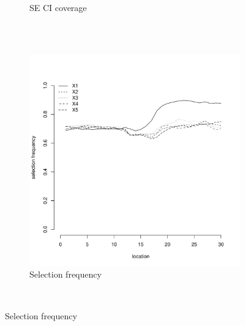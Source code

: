 \documentclass[authoryear, review, 11pt]{elsarticle}
\begin{document}
\begin{figure}
\begin{subfigure}[b]{0.45\textwidth}
		\caption{SE CI coverage}
	\end{subfigure}%
	\\%
	~ %
	\begin{subfigure}[b]{0.45\textwidth}
	\centering
		\includegraphics[width=\textwidth]{../../figures/simulation/15.35.profile_selection.pdf}
		\caption{Selection frequency}
	\end{subfigure}
	~ %

\end{figure}
\end{document}
